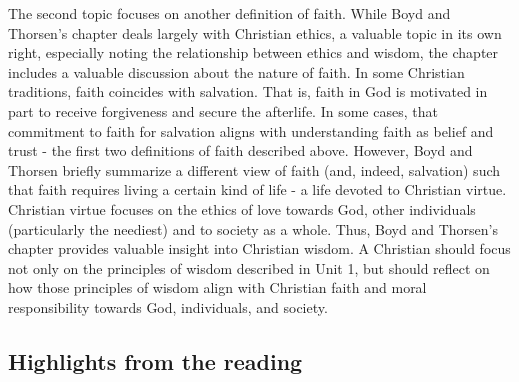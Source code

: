 \documentclass[
]{book}
\begin{document}
The second topic focuses on another definition of faith. While Boyd and Thorsen's chapter deals largely with Christian ethics, a valuable topic in its own right, especially noting the relationship between ethics and wisdom, the chapter includes a valuable discussion about the nature of faith. In some Christian traditions, faith coincides with salvation. That is, faith in God is motivated in part to receive forgiveness and secure the afterlife. In some cases, that commitment to faith for salvation aligns with understanding faith as belief and trust - the first two definitions of faith described above. However, Boyd and Thorsen briefly summarize a different view of faith (and, indeed, salvation) such that faith requires living a certain kind of life - a life devoted to Christian virtue. Christian virtue focuses on the ethics of love towards God, other individuals (particularly the neediest) and to society as a whole. Thus, Boyd and Thorsen's chapter provides valuable insight into Christian wisdom. A Christian should focus not only on the principles of wisdom described in Unit 1, but should reflect on how those principles of wisdom align with Christian faith and moral responsibility towards God, individuals, and society.

\hypertarget{highlights-from-the-reading-1}{%
\subsection*{Highlights from the reading}\label{highlights-from-the-reading-1}}
\end{document}
